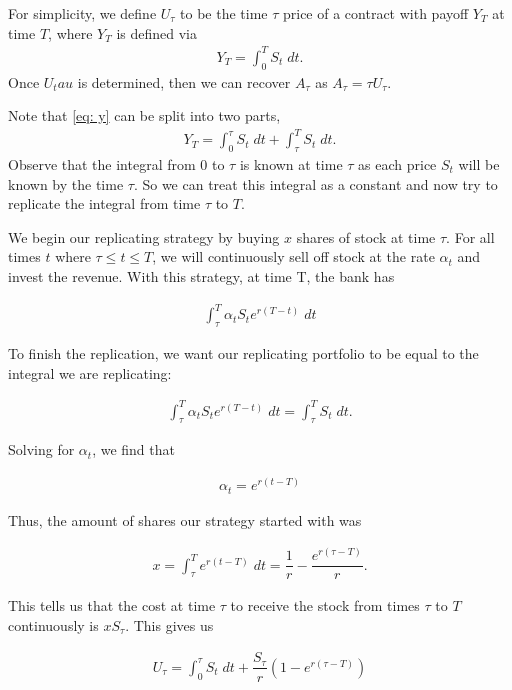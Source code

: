 \documentclass[reqno]{amsart}
\begin{document}
For simplicity, we define $U_\tau$ to be the time $\tau$ price of a contract with payoff $Y_T$ at time $T$, where $Y_T$ is defined via
\begin{align}\label{eq: y}
     Y_T = \int_0^T S_t \; dt.
\end{align}
Once $U_tau$ is determined, then we can recover $A_\tau$ as $A_\tau = \tau U_\tau$. 

Note that \eqref{eq: y} can be split into
two parts, 
\begin{align}
     Y_T = \int_0^\tau S_t \; dt + \int_\tau^T S_t \; dt.
\end{align}
Observe that the integral from $0$ to $\tau$ is known at time $\tau$ as each price $S_t$ will be known by the time $\tau$. So we can treat this integral as a constant and now try to replicate the integral from time $\tau$ to $T$.

We begin our replicating strategy by buying $x$ shares of stock at time $\tau$. For all times $t$ where $\tau \leq t \leq T$, we will continuously sell off stock at the rate $\alpha_t$ and invest the revenue.
With this strategy, at time T, the bank has 

\begin{align}
     \int_\tau^T \alpha_t S_t e^{r(T-t)} \; dt
\end{align}

To finish the replication, we want our replicating portfolio to be equal to the integral we are replicating:

\begin{align}
     \int_\tau^T \alpha_t S_t e^{r(T-t)} \; dt = \int_\tau^T S_t \; dt.
\end{align}

Solving for $\alpha_t$, we find that

\begin{align}
     \alpha_t = e^{r(t-T)}
\end{align}

Thus, the amount of shares our strategy started with was

\begin{align}
     x = \int_\tau^T e^{r(t-T)} \; dt = \dfrac{1}{r} - \dfrac{e^{r(\tau - T)}}{r}.
\end{align}

This tells us that the cost at time $\tau$ to receive the stock from times $\tau$ to $T$ continuously is $x S_\tau$. This gives us 

\begin{align}
     U_\tau = \int_0^\tau S_t \; dt + \dfrac{S_\tau}{r}\left( 1 - e^{r(\tau - T)} \right)
\end{align}
\end{document}
